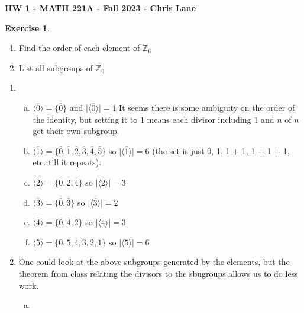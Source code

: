 \documentclass[11pt,oneside]{article}
\numberwithin{equation}{section}
\theoremstyle{definition}
\newtheorem{exercise}{Exercise}
\def\ZZ{\mathbb{Z}}
\begin{document}
\textbf{HW 1 - MATH 221A - Fall 2023 - Chris Lane}

\begin{exercise}
\begin{enumerate}[(1)]
\item 
Find the order of each element of $ \ZZ _ 6 $
\item 
  List all subgroups of $ \ZZ _ 6 $
\end{enumerate}
\end{exercise}

\begin{solution}
\begin{enumerate}[(1)]
\item 
\begin{enumerate}[(a)]
\item 
    $ \langle \overline 0 \rangle  = \{ \overline 0 \} $ and $ \lvert \langle \overline 0 \rangle \rvert = 1 $ It seems there is some ambiguity on the order of the identity, but setting it to $ 1 $ means each divisor including $1$ and $n$ of $n$ get their own subgroup.  
  \item
    $ \langle \overline 1 \rangle  = \{ \overline 0, \overline 1, \overline 2, \overline 3, \overline 4, \overline 5 \} $ so $ \lvert \langle \overline 1 \rangle \rvert = 6 $ (the set is just 0, 1, 1 + 1, 1 + 1 + 1, etc. till it repeats).
  \item
    $ \langle \overline 2 \rangle  = \{ \overline 0, \overline  2, \overline  4 \} $ so $ \lvert \langle \overline 2 \rangle \rvert = 3 $
  \item
    $ \langle \overline 3 \rangle  = \{ \overline 0, \overline  3 \} $ so $ \lvert \langle \overline 3 \rangle \rvert = 2 $
  \item
    $ \langle \overline 4 \rangle  = \{ \overline 0, \overline  4, \overline  2 \} $ so $ \lvert \langle \overline 4 \rangle \rvert = 3 $
  \item
    $ \langle \overline 5 \rangle  = \{ \overline 0 , \overline 5 , \overline 4 , \overline 3 , \overline 2 , \overline 1 \} $ so $ \lvert \langle \overline 5 \rangle \rvert = 6 $
\end{enumerate}
\item 
  One could look at the above subgroups generated by the elements, but the theorem from class relating the divisors to the sbugroups allows us to do less work.  
\begin{enumerate}[(a)]
\item 

\end{enumerate}
\end{enumerate}
\end{solution}
\end{document}
